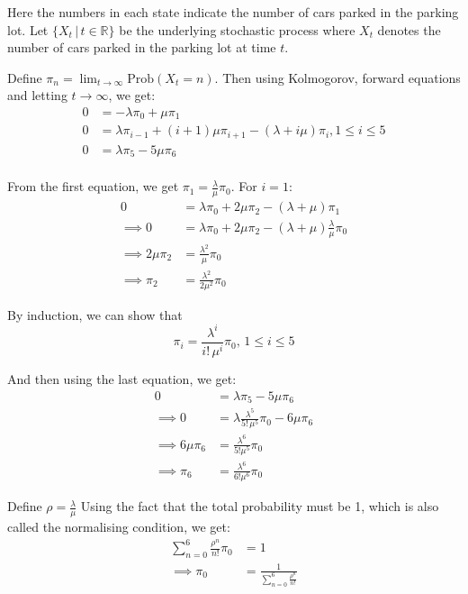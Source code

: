 \documentclass[12pt, oneside]{article}
\begin{document}
\begin{enumerate}
{    Here the numbers in each state indicate the number of cars parked in the parking lot.
    Let \(\{X_t \,|\, t \in \mathbb{R}\}\) be the underlying stochastic process where \(X_t\)
    denotes the number of cars parked in the parking lot at time \(t\).

    Define \(\pi_n = \lim_{t \to \infty} \text{Prob}(X_t = n)\). Then using Kolmogorov, forward
    equations and letting \(t \to \infty\), we get:
    \begin{align*}
        0 &= -\lambda\pi_0 + \mu\pi_1 \\
        0 &= \lambda \pi_{i-1} + (i+1)\mu \pi_{i+1} - (\lambda + i \mu) \pi_i, 1 \leq i \leq 5 \\
        0 &= \lambda \pi_5 - 5\mu \pi_6 \\
    \end{align*}

    From the first equation, we get \(\pi_1 = \frac{\lambda}{\mu}\pi_0\).
    For \(i = 1\):
    \begin{align*}
        0 &= \lambda \pi_{0} + 2\mu \pi_{2} - (\lambda + \mu) \pi_1 \\
        \implies 0 &= \lambda \pi_{0} + 2\mu \pi_{2} - (\lambda + \mu) \frac{\lambda}{\mu}\pi_0 \\
        \implies 2\mu \pi_2 &= \frac{\lambda^2}{\mu} \pi_0 \\
        \implies \pi_2 &= \frac{\lambda^2}{2\mu^2} \pi_0
    \end{align*}

    By induction, we can show that
    \[\pi_i = \frac{\lambda^i}{i!\,\mu^i} \pi_0,\, 1 \leq i \leq 5\]

    And then using the last equation, we get:
    \begin{align*}
        0 &= \lambda \pi_5 - 5\mu \pi_6 \\
        \implies 0 &= \lambda \frac{\lambda^5}{5!\,\mu^5} \pi_0 - 6\mu \pi_6 \\
        \implies 6\mu \pi_6 &= \frac{\lambda^6}{5!\mu^5} \pi_0 \\
        \implies \pi_6 &= \frac{\lambda^6}{6!\mu^6} \pi_0
    \end{align*}

    Define \(\rho = \frac{\lambda}{\mu}\)
    Using the fact that  the total probability must be 1, which is also called the
    normalising condition, we get:
    \begin{align*}
        \sum_{n = 0}^{6} \frac{\rho^n}{n!} \pi_0 &= 1 \\
        \implies \pi_0 &= \frac{1}{\sum_{n = 0}^{6} \frac{\rho^n}{n!}}
    \end{align*}

}
\end{enumerate}
\end{document}
